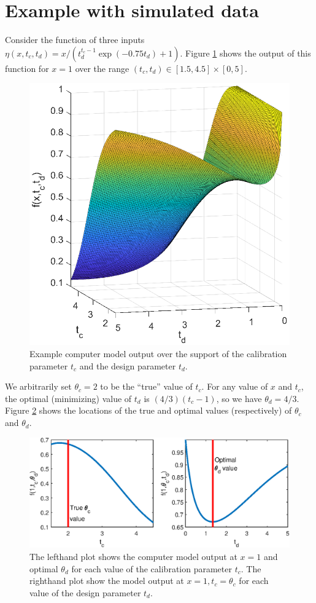 \documentclass[12pt]{article}
\begin{document}
\section{Example with simulated data}\label{sec:example}
%
Consider the function of three inputs $\eta(x,t_c,t_d) = x / (t_d^{t_c-1}\exp(-0.75t_d)+1)$. 
%
Figure \ref{fig:example_output} shows the output of this function for $x=1$ over the range $(t_c,t_d)\in[1.5,4.5]\times[0,5]$.
%
\begin{figure}
\centering
\includegraphics[scale=0.85]{FIG_obj_fn.eps}
\captionsetup{width=.85\linewidth}
\caption{Example computer model output over the support of the calibration parameter $t_c$ and the design parameter $t_d$.}
\label{fig:example_output}
\end{figure}
%
We arbitrarily set $\theta_c=2$ to be the ``true'' value of $t_c$.
%
For any value of $x$ and $t_c$, the optimal (minimizing) value of $t_d$ is $(4/3)(t_c-1)$, so we have $\theta_d=4/3.$
%
Figure \ref{fig:true_vals} shows the locations of the true and optimal values (respectively) of $\theta_c$ and $\theta_d$.
%
\begin{figure}
\centering
\includegraphics[scale=0.85]{FIG_true_optimal_theta1_theta2.eps}
 	\captionsetup{width=.85\linewidth}
\caption{The lefthand plot shows the computer model output at $x=1$ and optimal $\theta_d$ for each value of the calibration parameter $t_c$. The righthand plot show the model output at $x=1,t_c=\theta_c$ for each value of the design parameter $t_d$.}
\label{fig:true_vals}
\end{figure}
\end{document}
